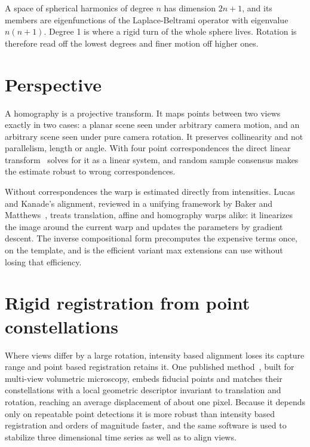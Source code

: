 A space of spherical harmonics of degree \(n\) has dimension \(2n+1\), and its members are
eigenfunctions of the Laplace-Beltrami operator with eigenvalue \(n(n+1)\). Degree 1 is where a rigid
turn of the whole sphere lives. Rotation is therefore read off the lowest degrees and finer
motion off higher ones.

\section{Perspective}

A homography is a projective transform. It maps points between two views exactly in two cases: a
planar scene seen under arbitrary camera motion, and an arbitrary scene seen under pure camera
rotation. It preserves collinearity and not parallelism, length or angle. With four point
correspondences the direct linear transform~\cite{src:Wikipedia-Direct-linear-transformation} solves for it as a linear system, and random sample
consensus makes the estimate robust to wrong correspondences.

Without correspondences the warp is estimated directly from intensities. Lucas and Kanade's
alignment, reviewed in a unifying framework by Baker and Matthews~\cite{src:Baker-and-Matthews-2004}, treats translation, affine and
homography warps alike: it linearizes the image around the current warp and updates the parameters
by gradient descent. The inverse compositional form precomputes the expensive terms once, on the
template, and is the efficient variant max extensions can use without losing that efficiency.

\section{Rigid registration from point constellations}

Where views differ by a large rotation, intensity based alignment loses its capture range and point
based registration retains it. One published method~\cite{src:Preibisch-Saalfeld-Schindelin-and-Tomancak-2010}, built for multi-view volumetric microscopy,
embeds fiducial points and matches their constellations with a local geometric descriptor invariant
to translation and rotation, reaching an average displacement of about one pixel. Because it depends
only on repeatable point detections it is more robust than intensity based registration and orders of
magnitude faster, and the same software is used to stabilize three dimensional time series as well as
to align views.
